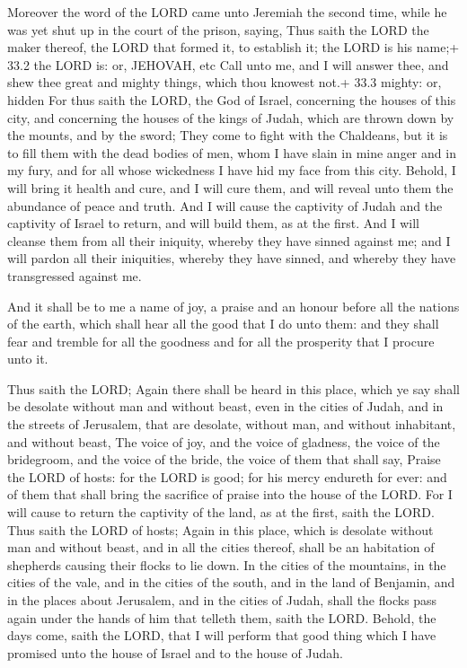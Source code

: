  Moreover the word of the LORD came unto Jeremiah the second
time, while he was yet shut up in the court of the prison, saying,
 Thus saith the LORD the maker thereof, the LORD that formed
it, to establish it; the LORD is his name;+ 33.2 the LORD is: or,
JEHOVAH, etc  Call unto me, and I will answer thee, and shew
thee great and mighty things, which thou knowest not.+ 33.3 mighty: or,
hidden  For thus saith the LORD, the God of Israel,
concerning the houses of this city, and concerning the houses of the
kings of Judah, which are thrown down by the mounts, and by the sword;
 They come to fight with the Chaldeans, but it is to fill
them with the dead bodies of men, whom I have slain in mine anger and in
my fury, and for all whose wickedness I have hid my face from this city.
 Behold, I will bring it health and cure, and I will cure
them, and will reveal unto them the abundance of peace and truth.
 And I will cause the captivity of Judah and the captivity
of Israel to return, and will build them, as at the first. 
And I will cleanse them from all their iniquity, whereby they have
sinned against me; and I will pardon all their iniquities, whereby they
have sinned, and whereby they have transgressed against me.

 And it shall be to me a name of joy, a praise and an
honour before all the nations of the earth, which shall hear all the
good that I do unto them: and they shall fear and tremble for all the
goodness and for all the prosperity that I procure unto it.

 Thus saith the LORD; Again there shall be heard in this
place, which ye say shall be desolate without man and without beast,
even in the cities of Judah, and in the streets of Jerusalem, that are
desolate, without man, and without inhabitant, and without beast,
 The voice of joy, and the voice of gladness, the voice of
the bridegroom, and the voice of the bride, the voice of them that shall
say, Praise the LORD of hosts: for the LORD is good; for his mercy
endureth for ever: and of them that shall bring the sacrifice of praise
into the house of the LORD. For I will cause to return the captivity of
the land, as at the first, saith the LORD.  Thus saith the
LORD of hosts; Again in this place, which is desolate without man and
without beast, and in all the cities thereof, shall be an habitation of
shepherds causing their flocks to lie down.  In the cities
of the mountains, in the cities of the vale, and in the cities of the
south, and in the land of Benjamin, and in the places about Jerusalem,
and in the cities of Judah, shall the flocks pass again under the hands
of him that telleth them, saith the LORD.  Behold, the days
come, saith the LORD, that I will perform that good thing which I have
promised unto the house of Israel and to the house of Judah.

